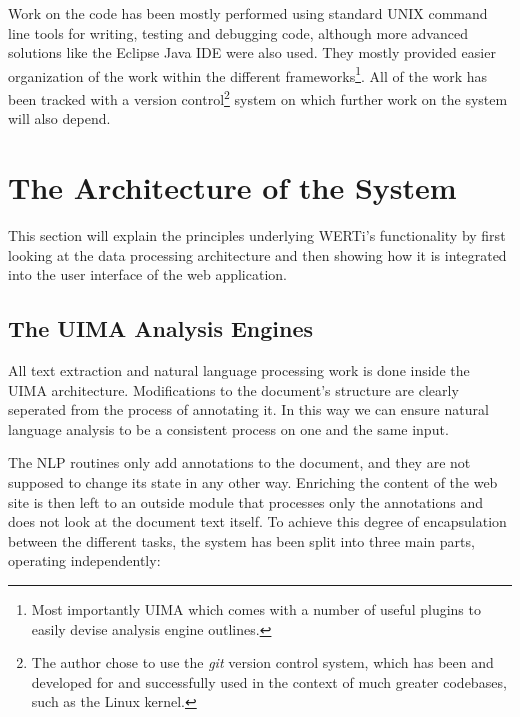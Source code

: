 \documentclass[12pt]{article}
\begin{document}
Work on the code has been mostly performed using standard UNIX command line
tools for writing, testing and debugging code, although more advanced solutions
like the Eclipse Java IDE were also used. They mostly provided easier
organization of the work within the different frameworks\footnote{Most
importantly UIMA which comes with a number of useful plugins to easily devise
analysis engine outlines.}. All of the work has been tracked with a version
control\footnote{The author chose to use the \emph{git} version control system,
which has been and developed for and successfully used in the context of much greater
codebases, such as the Linux kernel.} system on which further work on the system
will also depend.

\section{The Architecture of the System}

This section will explain the principles underlying WERTi's functionality by
first looking at the data processing architecture and then showing how it is
integrated into the user interface of the web application.


\subsection{The UIMA Analysis Engines}\label{sec:UIMA}

All text extraction and natural language processing work is done inside the UIMA
architecture.  Modifications  to the document's structure are clearly seperated
from the process of annotating it. In this way we can ensure natural language
analysis to be a consistent process on one and the same input.

The NLP routines only add annotations to the document, and they are not supposed
to change its state in any other way. Enriching the content of the web site is
then left to an outside module that processes only the annotations and does not
look at the document text itself. To achieve this degree of encapsulation
between the different tasks, the system has been split into three main parts,
operating independently:
\end{document}
